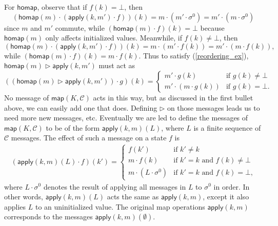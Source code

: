 \documentclass[acmsmall,nonacm]{acmart}
\newcommand{\mc}[1]{\ensuremath{\mathcal{#1}}}
\newcommand{\msf}[1]{\ensuremath{\mathsf{#1}}}
\newcommand{\act}{\triangleright}
\theoremstyle{plain}
\theoremstyle{definition}
\begin{document}
For $\msf{homap}$, observe that if $f(k) = \bot$, then
\[
\left(\msf{homap}(m) \cdot (\msf{apply}(k, m') \cdot f)\right)(k) = m \cdot (m' \cdot \sigma^0) = m' \cdot (m \cdot \sigma^0)
\]
since $m$ and $m'$ commute, while $(\msf{homap}(m) \cdot f)(k) = \bot$ because $\msf{homap}(m)$ only affects initialized values.   Meanwhile, if $f(k) \neq \bot$, then
\[
\left(\msf{homap}(m) \cdot (\msf{apply}(k, m') \cdot f)\right)(k) = m \cdot (m' \cdot f(k)) = m' \cdot (m \cdot f(k)),
\]
while $(\msf{homap}(m) \cdot f)(k) = m \cdot f(k)$.  Thus to satisfy (\ref{reordering_ex}), $\msf{homap}(m) \act \msf{apply}(k, m')$ must act as
\[
((\msf{homap}(m) \act \msf{apply}(k, m')) \cdot g)(k) = \begin{cases} m' \cdot g(k) &\mbox{if $g(k) \neq \bot$} \\ m' \cdot (m \cdot g(k)) &\mbox{if $g(k) = \bot$.} \end{cases}
\]
No message of $\msf{map}(K, \mc{C})$ acts in this way, but as discussed in the first bullet above, we can easily add one that does.  Defining $\act$ on those messages leads us to need more new messages, etc.  Eventually we are led to define the messages of $\msf{map}(K, \mc{C})$ to be of the form $\msf{apply}(k, m)(L)$, where $L$ is a finite sequence of $\mc{C}$ messages.  The effect of such a message on a state $f$ is
\begin{align*}
(\msf{apply}(k, m)(L) \cdot f)(k') = \begin{cases} f(k') &\mbox{if $k' \neq k$} \\ m \cdot f(k) &\mbox{if $k' = k$ and $f(k) \neq \bot$} \\ m \cdot (L \cdot \sigma^0) &\mbox{if $k' = k$ and $f(k) = \bot$,} \end{cases}
\end{align*}
where $L \cdot \sigma^0$ denotes the result of applying all messages in $L$ to $\sigma^0$ in order.  In other words, $\msf{apply}(k, m)(L)$ acts the same as $\msf{apply}(k, m)$, except it also applies $L$ to an uninitialized value.  The original map operations $\msf{apply}(k, m)$ corresponds to the messages $\msf{apply}(k, m)(\emptyset)$.
\end{document}
